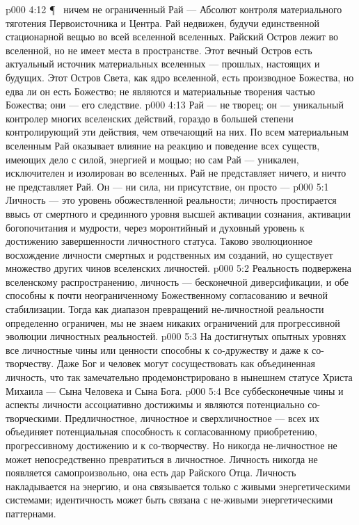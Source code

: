 \vs p000 4:12 \P\  ничем не ограниченный Рай --- Абсолют контроля материального тяготения Первоисточника и Центра. Рай недвижен, будучи единственной стационарной вещью во всей вселенной вселенных. Райский Остров лежит во вселенной, но не имеет места в пространстве. Этот вечный Остров есть актуальный источник материальных вселенных --- прошлых, настоящих и будущих. Этот Остров Света, как ядро вселенной, есть производное Божества, но едва ли он есть Божество; не являются и материальные творения частью Божества; они --- его следствие.
\vs p000 4:13 Рай --- не творец; он --- уникальный контролер многих вселенских действий, гораздо в большей степени контролирующий эти действия, чем отвечающий на них. По всем материальным вселенным Рай оказывает влияние на реакцию и поведение всех существ, имеющих дело с силой, энергией и мощью; но сам Рай --- уникален, исключителен и изолирован во вселенных. Рай не представляет ничего, и ничто не представляет Рай. Он --- ни сила, ни присутствие, он просто --- 
\vs p000 5:1 Личность --- это уровень обожествленной реальности; личность простирается ввысь от смертного и срединного уровня высшей активации сознания, активации богопочитания и мудрости, через моронтийный и духовный уровень к достижению завершенности личностного статуса. Таково эволюционное восхождение личности смертных и родственных им созданий, но существует множество других чинов вселенских личностей.
\vs p000 5:2 Реальность подвержена вселенскому распространению, личность --- бесконечной диверсификации, и обе способны к почти неограниченному Божественному согласованию и вечной стабилизации. Тогда как диапазон превращений не\hyp{}личностной реальности определенно ограничен, мы не знаем никаких ограничений для прогрессивной эволюции личностных реальностей.
\vs p000 5:3 На достигнутых опытных уровнях все личностные чины или ценности способны к со\hyp{}дружеству и даже к со\hyp{}творчеству. Даже Бог и человек могут сосуществовать как объединенная личность, что так замечательно продемонстрировано в нынешнем статусе Христа Михаила --- Сына Человека и Сына Бога.
\vs p000 5:4 Все суббесконечные чины и аспекты личности ассоциативно достижимы и являются потенциально со\hyp{}творческими. Предличностное, личностное и сверхличностное --- всех их объединяет потенциальная способность к согласованному приобретению, прогрессивному достижению и к со\hyp{}творчеству. Но никогда не\hyp{}личностное не может непосредственно превратиться в личностное. Личность никогда не появляется самопроизвольно, она есть дар Райского Отца. Личность накладывается на энергию, и она связывается только с живыми энергетическими системами; идентичность может быть связана с не\hyp{}живыми энергетическими паттернами.
